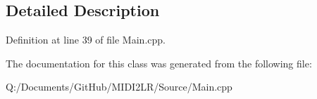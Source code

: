 \subsection{Detailed Description}


Definition at line 39 of file Main.\+cpp.



The documentation for this class was generated from the following file\+:\begin{DoxyCompactItemize}
\item 
Q\+:/\+Documents/\+Git\+Hub/\+M\+I\+D\+I2\+L\+R/\+Source/Main.\+cpp\end{DoxyCompactItemize}
